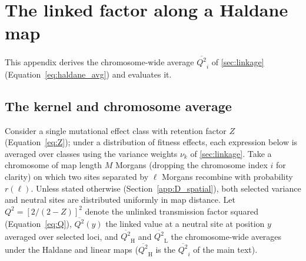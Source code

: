 \documentclass{article}
\begin{document}
    \linenumbers
    \appendix
\fi

\section{The linked factor along a Haldane map}\label{app:chromosapp}
This appendix derives the chromosome-wide average $\overline{Q^2}_i$ of \autoref{sec:linkage} (Equation~\eqref{eq:haldane_avg}) and evaluates it.

\subsection{The kernel and chromosome average}\label{app:D_kernel}
Consider a single mutational effect class with retention factor $Z$ (Equation~\eqref{eq:Z}); under a distribution of fitness effects, each expression below is averaged over classes using the variance weights $\nu_k$ of \autoref{sec:linkage}. Take a chromosome of map length $M$ Morgans (dropping the chromosome index $i$ for clarity) on which two sites separated by $\ell$ Morgans recombine with probability $r(\ell)$. Unless stated otherwise (Section~\ref{app:D_spatial}), both selected variance and neutral sites are distributed uniformly in map distance. Let $Q^2 = [2/(2-Z)]^2$ denote the unlinked transmission factor squared (Equation~\eqref{eq:Q}), $\overline{Q^2}(y)$ the linked value at a neutral site at position $y$ averaged over selected loci, and $\overline{Q^2}_\text{H}$ and $\overline{Q^2}_\text{L}$ the chromosome-wide averages under the Haldane and linear maps ($\overline{Q^2}_\text{H}$ is the $\overline{Q^2}_i$ of the main text).
\end{document}
